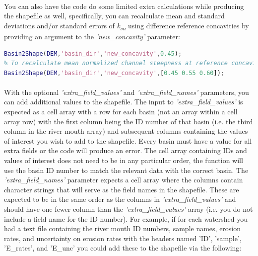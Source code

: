 \paragraph{}You can also have the code do some limited extra calculations while producing the shapefile as well, specifically, you can recalculate mean and standard deviations and/or standard errors of \textit{k\textsubscript{sn}} using difference reference concavities by providing an argument to the \textit{'new\_concavity'} parameter:

\begin{lstlisting}[language=Matlab]
% To recaculate mean normalized channel steepness with a reference concavity of 0.45
Basin2Shape(DEM,'basin_dir','new_concavity',0.45);
% To recalculate mean normalized channel steepness at reference concavities of 0.45, 0.55, and 0.60
Basin2Shape(DEM,'basin_dir','new_concavity',[0.45 0.55 0.60]);
\end{lstlisting}

\paragraph{}With the optional \textit{'extra\_field\_values'} and \textit{'extra\_field\_names'} parameters, you can add additional values to the shapefile. The input to \textit{'extra\_field\_values'} is expected as a cell array with a row for each basin (not an array within a cell array row) with the first column being the ID number of that basin (i.e. the third column in the river mouth array) and subsequent columns containing the values of interest you wish to add to the shapefile. Every basin must have a value for all extra fields or the code will produce an error. The cell array containing IDs and values of interest does not need to be in any particular order, the function will use the basin ID number to match the relevant data with the correct basin. The \textit{'extra\_field\_names'} parameter expects a cell array where the columns contain character strings that will serve as the field names in the shapefile. These are expected to be in the same order as the columns in \textit{'extra\_field\_values'} and should have one fewer column than the \textit{'extra\_field\_values'}  array (i.e. you do not include a field name for the ID number). For example, if for each watershed you had a text file containing the river mouth ID numbers, sample names, erosion rates, and uncertainty on erosion rates with the headers named 'ID', 'sample', 'E\_rates', and 'E\_unc' you could add these to the shapefile via the following:

